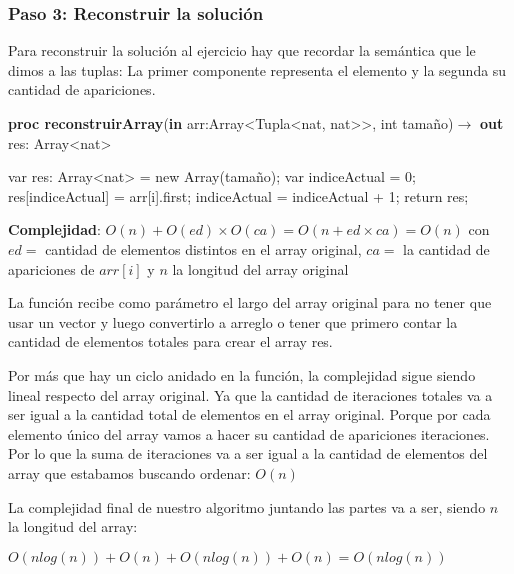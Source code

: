 \documentclass{article}
\newcommand{\Complexity}[1]{\textbf{Complejidad}: #1}
\begin{document}
\subsubsection*{Paso 3: Reconstruir la solución}
Para reconstruir la solución al ejercicio hay que recordar la semántica que le dimos a las tuplas: La primer componente representa el elemento y la segunda su cantidad de apariciones.
\vspace{-0.75em}
\begin{algorithm}[H]
    \caption{
        \textbf{proc reconstruirArray}(\textbf{in} arr:\textnormal{Array\textless{}Tupla\textless{}nat, nat\textgreater{}\textgreater{}}, int tamaño)$\to$ \textbf{out} res: \textnormal{Array\textless{}nat\textgreater{}}
    }
    \begin{algorithmic}[1]
        \State var res: Array\textless{}nat\textgreater{} = new Array(tamaño); 
        \State var indiceActual = 0;
          
             
                \State res[indiceActual] = arr[i].first; 
                \State indiceActual = indiceActual + 1; 
            \EndFor
        \EndFor
        \State return res;
    \end{algorithmic}
    \Complexity{$O(n) + O(ed) \times O(ca) = O(n + ed \times ca) = O(n)$  con $ed =$ cantidad de elementos distintos en el array original, $ca =$ la cantidad de apariciones de $arr[i]$ y $n$ la longitud del array original}
\end{algorithm}
\vspace{-0.95em}
La función recibe como parámetro el largo del array original para no tener que usar un vector y luego convertirlo a arreglo o tener que primero contar la cantidad de elementos totales para crear el array res. 

Por más que hay un ciclo anidado en la función, la complejidad sigue siendo lineal respecto del array original. Ya que la cantidad de iteraciones totales va a ser igual a la cantidad total de elementos en el array original. Porque por cada elemento único del array vamos a hacer su cantidad de apariciones iteraciones. Por lo que la suma de iteraciones va a ser igual a la cantidad de elementos del array que estabamos buscando ordenar: \textbf{$O(n)$}

La complejidad final de nuestro algoritmo juntando las partes va a ser, siendo $n$ la longitud del array:
\vspace{-0.95em}
\begin{center}
    
    \textbf{$O(nlog(n)) + O(n) + O(nlog(n)) + O(n) = O(nlog(n))$}
    
\end{center}
\label{sec:explanation1}
\vspace{-0.2em}
\end{document}
